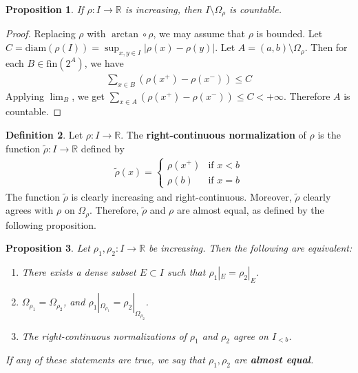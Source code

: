 \documentclass[12pt,b5paper,notitlepage]{article}
\theoremstyle{definition}
\newtheorem{df}{Definition}[section]
\theoremstyle{plain}
\newtheorem{pp}[df]{Proposition}
\newcommand{\wtd}{\widetilde}
\newcommand{\Rbb}{\mathbb R}
\newcommand{\fin}{\mathrm{fin}}
\newcommand{\diam}{\mathrm{diam}}
\numberwithin{equation}{section}
\begin{document}
\begin{pp}\label{lb62}
If $\rho:I\rightarrow\Rbb$ is increasing, then $I\setminus\Omega_\rho$ is countable.
\end{pp}

\begin{proof}
Replacing $\rho$ with $\arctan\circ\rho$, we may assume that $\rho$ is bounded. Let $C=\diam(\rho(I))=\sup_{x,y\in I}|\rho(x)-\rho(y)|$. Let $A=(a,b)\setminus\Omega_\rho$. Then for each $B\in\fin(2^A)$, we have
\begin{align*}
\sum_{x\in B}(\rho(x^+)-\rho(x^-))\leq C
\end{align*}
Applying $\lim_B$, we get $\sum_{x\in A}(\rho(x^+)-\rho(x^-))\leq C<+\infty$. Therefore $A$ is countable.
\end{proof}


\begin{df}
Let $\rho:I\rightarrow\Rbb$. The \textbf{right-continuous normalization}  of $\rho$ is the function $\wtd\rho:I\rightarrow \Rbb$ defined by
\begin{gather*}
\wtd\rho(x)=\left\{
\begin{array}{ll}
\rho(x^+)&\text{if }x<b\\[0.5ex]
\rho(b)&\text{if }x=b
\end{array}
\right.
\end{gather*}
The function $\wtd\rho$ is clearly increasing and right-continuous. Moreover, $\wtd\rho$ clearly agrees with $\rho$ on $\Omega_\rho$. Therefore, $\wtd\rho$ and $\rho$ are almost equal, as defined by the following proposition.
\end{df}



\begin{pp}\label{lb70}
Let $\rho_1,\rho_2:I\rightarrow\Rbb$ be increasing. Then the following are equivalent:
\begin{enumerate}[label=(\alph*)]
\item There exists a dense subset $E\subset I$ such that $\rho_1|_E=\rho_2|_E$.
\item $\Omega_{\rho_1}=\Omega_{\rho_2}$, and $\rho_1|_{\Omega_{\rho_1}}=\rho_2|_{\Omega_{\rho_2}}$.
\item The right-continuous normalizations of $\rho_1$ and $\rho_2$ agree on $I_{<b}$.
\end{enumerate}
If any of these statements are true, we say that $\rho_1,\rho_2$ are \textbf{almost equal}. 
\end{pp}
\end{document}
